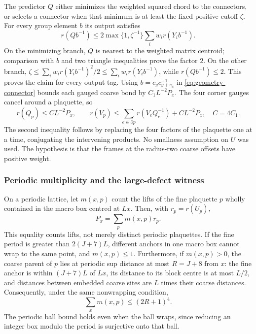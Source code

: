 The predictor $Q$ either minimizes the weighted squared chord to the
connectors, or selects a connector when that minimum is at least the
fixed positive cutoff $\zeta$. For every group element $b$ its output
satisfies
\[
 r(Qb^{-1})\le2\max\{1,\zeta^{-1}\}\sum_iw_i r(Y_ib^{-1}).
\]
On the minimizing branch, $Q$ is nearest to the weighted matrix
centroid; comparison with $b$ and two triangle inequalities prove the
factor $2$. On the other branch,
$\zeta\le\sum_iw_i r(Y_ib^{-1})^2/2\le\sum_iw_i r(Y_ib^{-1})$,
while $r(Qb^{-1})\le2$. This proves the claim for every output tag.
Using $b=c_yc_{y+e_a}^{-1}$ in \eqref{eq:geometry-connector} bounds
each gauged coarse bond by $C_1L^{-2}P_x$. The four corner gauges
cancel around a plaquette, so
\begin{equation}\label{eq:geometry-predictor-curvature}
 r(Q_p)\le C L^{-2}P_x,\qquad
 r(V_p)\le\sum_{e\in\partial p}r(V_eQ_e^{-1})+C L^{-2}P_x,
 \quad C=4C_1.
\end{equation}
The second inequality follows by replacing the four factors of the
plaquette one at a time, conjugating the intervening products.
No smallness assumption on $U$ was used. The hypothesis is that the
frames at the radius-two coarse offsets have positive weight.

\subsubsection{Periodic multiplicity and the large-defect witness}
On a periodic lattice, let $m(x,p)$ count the lifts of the fine
plaquette $p$ wholly contained in the macro box centred at $Lx$.
Then, with $r_p=r(U_p)$,
\begin{equation}\label{eq:geometry-port}
 P_x=\sum_p m(x,p)r_p.
\end{equation}
This equality counts lifts, not merely distinct periodic plaquettes.
If the fine period is greater than $2(J+7)L$, different anchors in
one macro box cannot wrap to the same point, and $m(x,p)\le1$.
Furthermore, if $m(x,p)>0$, the coarse parent of $p$ lies at periodic
sup distance at most $R=J+8$ from $x$: the fine anchor is within
$(J+7)L$ of $Lx$, its distance to its block centre is at most $L/2$,
and distances between embedded coarse sites are $L$ times their
coarse distances. Consequently, under the same nonwrapping condition,
\begin{equation}\label{eq:geometry-port-column}
 \sum_xm(x,p)\le(2R+1)^4.
\end{equation}
The periodic ball bound holds even when the ball wraps, since reducing
an integer box modulo the period is surjective onto that ball.

